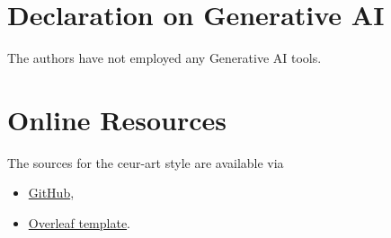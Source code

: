 \documentclass[
]{./CEURART/ceurart}
\begin{document}
\section*{Declaration on Generative AI}
The authors have not employed any Generative AI tools.
\newline

% 

\appendix

\section{Online Resources}


The sources for the ceur-art style are available via
\begin{itemize}
	\item \href{https://github.com/yamadharma/ceurart}{GitHub},
	\item
	      \href{https://www.overleaf.com/latex/templates/template-for-submissions-to-ceur-workshop-proceedings-ceur-ws-dot-org/pkfscdkgkhcq}{Overleaf
		      template}.
\end{itemize}
\end{document}
